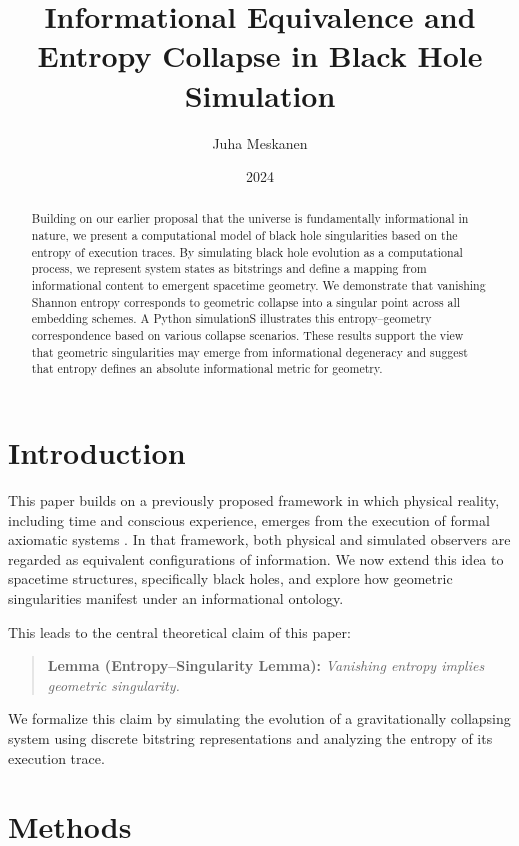 \documentclass[11pt]{article}
\title{Informational Equivalence and Entropy Collapse in Black Hole Simulation}
\author{Juha Meskanen}
\date{2024}
\begin{document}
\maketitle

\begin{abstract}
  Building on our earlier proposal that the universe is fundamentally informational in nature, we present a computational model of black hole singularities based on the entropy of execution traces. By simulating black hole evolution as a computational process, we represent system states as bitstrings and define a mapping from informational content to emergent spacetime geometry. We demonstrate that vanishing Shannon entropy corresponds to geometric collapse into a singular point across all embedding schemes. A Python simulationS illustrates this entropy--geometry correspondence based on various collapse scenarios. These results support the view that geometric singularities may emerge from informational degeneracy and suggest that entropy defines an absolute informational metric for geometry.
\end{abstract}

\section{Introduction}

This paper builds on a previously proposed framework in which physical reality, including time and conscious experience, emerges from the execution of formal axiomatic systems \cite{meskanen2019}. In that framework, both physical and simulated observers are regarded as equivalent configurations of information. We now extend this idea to spacetime structures, specifically black holes, and explore how geometric singularities manifest under an informational ontology.

This leads to the central theoretical claim of this paper:

\begin{quote}
  \textbf{Lemma (Entropy--Singularity Lemma):} \emph{Vanishing entropy implies geometric singularity.}
\end{quote}

We formalize this claim by simulating the evolution of a gravitationally collapsing system using discrete bitstring representations and analyzing the entropy of its execution trace.

\section{Methods}
\end{document}
